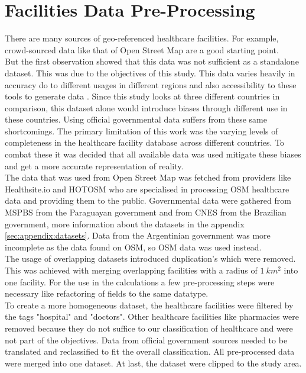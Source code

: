 \documentclass[11pt, a4paper]{report}
\begin{document}
\section{Facilities Data Pre-Processing}\label{sec:method:healthcaredist}
There are many sources of geo-referenced healthcare facilities. For example, crowd-sourced data like that of Open Street Map are a good starting point. \\
%
But the first observation showed that this data was not sufficient as a standalone dataset. This was due to the objectives of this study. This data varies heavily in accuracy do to different usages in different regions and also accessibility to these tools to generate data \citet{haklay_how_2010}. Since this study looks at three different countries in comparison, this dataset alone would introduce biases through different use in these countries. Using official governmental data suffers from these same shortcomings. The primary limitation of this work was the varying levels of completeness in the healthcare facility database across different countries. To combat these it was decided that all available data was used mitigate these biases and get a more accurate representation of reality. \\
%
The data that was used from Open Street Map was fetched from providers like Healthsite.io and  HOTOSM who are specialised in processing OSM healthcare data and providing them to the public. Governmental data were gathered from MSPBS from the Paraguayan government and from CNES from the Brazilian government, more information about the datasets in the appendix \ref{sec:appendix:datasets}. Data from the Argentinian government was more incomplete as the data found on OSM, so OSM data was used instead. \\
%
The usage of overlapping datasets introduced duplication's which were removed. This was achieved with merging overlapping facilities with a radius of  $1 \ km^2$ into one facility. 
For the use in the calculations a few pre-processing steps were necessary like refactoring of fields to the same datatype. \\
%
To create a more homogeneous dataset, the healthcare facilities were filtered by the tags "hospital" and "doctors". Other healthcare facilities like pharmacies were removed because they do not suffice to our classification of healthcare and were not part of the objectives. Data from official government sources needed to be translated and reclassified to fit the overall classification. 
All pre-processed data were merged into one dataset. At last, the dataset were clipped to the study area.
\end{document}
